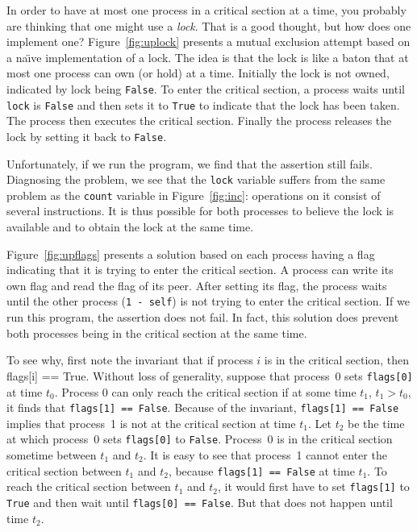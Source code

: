 \documentclass{report}
\begin{document}
In order to have at most one process in a critical section at a time, you
probably are thinking that one might use a \emph{lock}.
That is a good thought, but how does one implement one?
Figure~\ref{fig:uplock} presents a mutual exclusion attempt based on a
na\"{\i}ve implementation of a lock.
The idea is that the lock is like a baton that at most one process can own
(or hold) at a time.
Initially the lock is not owned, indicated by lock being \texttt{False}.
To enter the critical section, a process waits until \texttt{lock} is \texttt{False}
and then sets it to \texttt{True} to indicate that the lock has been taken.
The process then executes the critical section.  Finally the process
releases the lock by setting it back to \texttt{False}.

Unfortunately, if we run the program, we find that the assertion still
fails.  Diagnosing the problem, we see that the \texttt{lock} variable
suffers from the same problem as the \texttt{count} variable
in Figure~\ref{fig:inc}: operations
on it consist of several instructions.  It is thus possible
for both processes to believe the lock is available and to obtain the lock
at the same time.

Figure~\ref{fig:upflags} presents a solution based on each process having
a flag indicating that it is trying to enter the critical section.
A process can write its own flag and read the flag of its peer.
After setting its flag, the process waits until the other process
(\texttt{1 - self}) is not trying to enter the critical section.
If we run this program, the assertion does not fail.  In fact, this
solution does prevent both processes being in the critical section at
the same time.

To see why, first note the invariant that if process $i$ is in the
critical section, then flags[i] == True.
Without loss of generality,
suppose that process~0 sets \texttt{flags[0]} at time $t_0$.
Process 0 can only reach the critical section if at some time $t_1$,
$t_1 > t_0$, it finds that \texttt{flags[1] == False}.
Because of the invariant, \texttt{flags[1] == False} implies that
process~1 is not at the critical section at time $t_1$.
Let $t_2$ be the time at which process~0 sets \texttt{flags[0]}
to \texttt{False}.  Process~0 is in the critical section sometime
between $t_1$ and $t_2$.
It is easy to see that process~1 cannot enter the critical section
between $t_1$ and $t_2$, because \texttt{flags[1] == False} at
time $t_1$.  To reach the critical section between $t_1$ and $t_2$,
it would first have to set \texttt{flags[1]} to \texttt{True} and
then wait until \texttt{flags[0] == False}.  But that does not happen
until time $t_2$.
\end{document}
